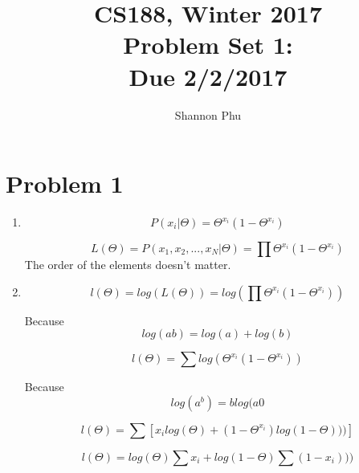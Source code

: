 \documentclass[11pt]{article}
\newcommand{\cnum}{CS188}
\newcommand{\ced}{Winter 2017}
\newcommand{\ctitle}[3]{\title{\vspace{-0.5in}\cnum, \ced\\Problem Set #1: #2\\Due #3}}
\begin{document}
\ctitle{1}{}{2/2/2017}
\author{Shannon Phu}
\date{}
\maketitle
\vspace{-0.3in}

\section{Problem 1}
    \begin{enumerate}
        \item
            \begin{equation}
                P(x_{i}|\Theta )=\Theta ^{x_{i}}(1-\Theta ^{x_{i}})
            \end{equation}
            
            \begin{equation}
                L(\Theta)=P(x_{1},x_{2},...,x_{N}|\Theta )=\prod\Theta ^{x_{i}}(1-\Theta ^{x_{i}})
            \end{equation}
            The order of the elements doesn't matter.
        
        \item
            \begin{equation}
                l(\Theta )=log(L(\Theta ))=log(\prod\Theta ^{x_{i}}(1-\Theta ^{x_{i}}))
            \end{equation}
            
            Because
            \begin{equation}
                log(ab)=log(a)+log(b)
            \end{equation}
            
            \begin{equation}
                l(\Theta)=\sum log(\Theta ^{x_{i}}(1-\Theta ^{x_{i}}))
            \end{equation}
            
            Because
            \begin{equation}
                log(a^{b})=blog(a0
            \end{equation}
            
            \begin{equation}
                l(\Theta)=\sum [x_{i}log(\Theta)+(1-\Theta ^{x_{i}})log(1-\Theta )))]
            \end{equation}
            
            \begin{equation}
                l(\Theta)=log(\Theta) \sum x_{i}+ log(1-\Theta ) \sum (1-x_{i})))
            \end{equation}
            

\end{enumerate}
\end{document}
